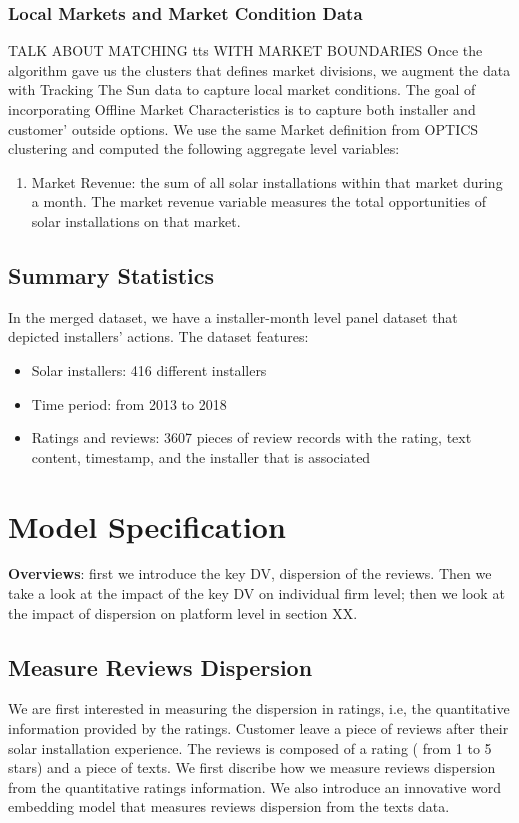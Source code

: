 \documentclass[msom,blindrev]{informs3}
\begin{document}
\subsubsection{Local Markets and Market Condition Data}
TALK ABOUT MATCHING tts WITH MARKET BOUNDARIES 
Once the algorithm gave us the clusters that defines market divisions, we augment the data with Tracking The Sun data to capture local market conditions. The goal of incorporating Offline Market Characteristics is to capture both installer and customer' outside options. We use the same Market definition from OPTICS clustering and computed the following aggregate level variables: 
\begin{enumerate}
	\item Market Revenue: the sum of all solar installations within that market during a month. The market revenue variable measures the total opportunities of solar installations on that market. 
\end{enumerate} 
\subsection{Summary Statistics}
In the merged dataset, we have a installer-month level panel dataset that depicted installers' actions. The dataset features: 
\begin{itemize}
\item Solar installers: 416 different installers
\item Time period: from 2013 to 2018
\item Ratings and reviews: 3607 pieces of review records with the rating, text content, timestamp, and the installer that is associated  
\end{itemize}
\section{Model Specification}
\textbf{Overviews}: first we introduce the key DV, dispersion of the reviews. Then we take a look at the impact of the key DV on individual firm level; then we look at the impact of dispersion on platform level in section XX.  

\subsection{Measure Reviews Dispersion}
\label{subsection_measure_dispersion}
We are first interested in measuring the dispersion in ratings, i.e, the quantitative information provided by the ratings. Customer leave a piece of reviews after their solar installation experience. The reviews is composed of a rating ( from 1 to 5 stars) and a piece of texts. We first discribe how we measure reviews dispersion from the quantitative ratings information. We also introduce an innovative word embedding model that measures reviews dispersion from the texts data. 
\end{document}
